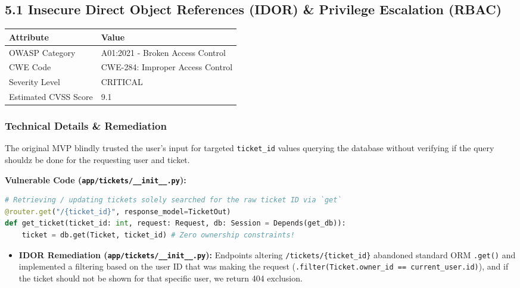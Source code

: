 \documentclass[11pt]{article}
\begin{document}
\subsection*{5.1 Insecure Direct Object References (IDOR) \& Privilege Escalation (RBAC)}

\begin{table}[htbp]
\centering
\begin{tabular}{|l|l|}
\hline
\textbf{Attribute} & \textbf{Value} \\ \hline
OWASP Category & A01:2021 - Broken Access Control \\ \hline
CWE Code & CWE-284: Improper Access Control \\ \hline
Severity Level & CRITICAL \\ \hline
Estimated CVSS Score & 9.1 \\ \hline
\end{tabular}
\end{table}

\subsubsection*{Technical Details \& Remediation}

The original MVP blindly trusted the user's input for targeted \texttt{ticket\_id} values querying the database without verifying if the query shouldz be done for the requesting user and ticket.

\textbf{Vulnerable Code (\texttt{app/tickets/\_\_init\_\_.py}):}
\begin{lstlisting}[language=Python]
# Retrieving / updating tickets solely searched for the raw ticket ID via `get`
@router.get("/{ticket_id}", response_model=TicketOut)
def get_ticket(ticket_id: int, request: Request, db: Session = Depends(get_db)):
    ticket = db.get(Ticket, ticket_id) # Zero ownership constraints!
\end{lstlisting}

\begin{itemize}
    \item \textbf{IDOR Remediation (\texttt{app/tickets/\_\_init\_\_.py}):} Endpoints altering \texttt{/tickets\allowbreak/\{ticket\_id\}} abandoned standard ORM \texttt{.get()} and implemented a filtering based on the user ID that was making the request (\texttt{.filter(Ticket.owner\_id == current\_user.id)}), and if the ticket should not be shown for that specific user, we return 404 exclusion.
\end{itemize}
\end{document}
